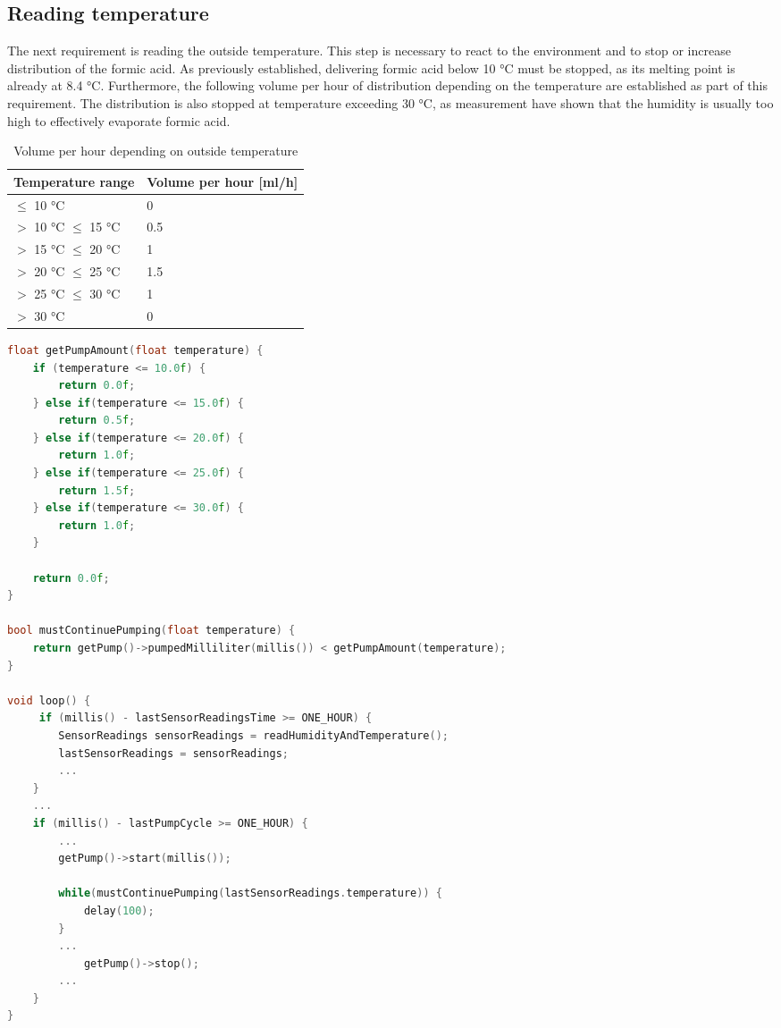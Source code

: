 \subsection{Reading temperature}\label{subsec:reading-temperature}

The next requirement is reading the outside temperature.
This step is necessary to react to the environment and to stop or increase distribution of the formic acid.
As previously established, delivering formic acid below 10 °C must be stopped, as its melting point is already at 8.4 °C.
Furthermore, the following volume per hour of distribution depending on the temperature are established as part of this requirement.
The distribution is also stopped at temperature exceeding 30 °C, as measurement have shown that the humidity is usually too high to effectively evaporate formic acid.

\begin{table}[h]
    \centering
    \caption{Volume per hour depending on outside temperature}
    \label{tab:volume-per-hour-depending-on-temperature}
    \renewcommand{\arraystretch}{1.2}
    \begin{tabular}{l|l}
        Temperature range & Volume per hour [ml/h] \\
        \hline
        $\leq$ 10 °C & 0 \\
        $ > $ 10 °C $\leq$ 15 °C & 0.5 \\
        $ > $ 15 °C $\leq$ 20 °C & 1 \\
        $ > $ 20 °C $\leq$ 25 °C & 1.5 \\
        $ > $ 25 °C $\leq$ 30 °C & 1 \\
        $ > $ 30 °C & 0
    \end{tabular}
\end{table}

\newpage
\begin{lstlisting}[label={lst:react-to-temperature},language=C++, caption=Determining volume based on temperature]
float getPumpAmount(float temperature) {
    if (temperature <= 10.0f) {
        return 0.0f;
    } else if(temperature <= 15.0f) {
        return 0.5f;
    } else if(temperature <= 20.0f) {
        return 1.0f;
    } else if(temperature <= 25.0f) {
        return 1.5f;
    } else if(temperature <= 30.0f) {
        return 1.0f;
    }

    return 0.0f;
}

bool mustContinuePumping(float temperature) {
    return getPump()->pumpedMilliliter(millis()) < getPumpAmount(temperature);
}

void loop() {
     if (millis() - lastSensorReadingsTime >= ONE_HOUR) {
        SensorReadings sensorReadings = readHumidityAndTemperature();
        lastSensorReadings = sensorReadings;
        ...
    }
    ...
    if (millis() - lastPumpCycle >= ONE_HOUR) {
        ...
        getPump()->start(millis());

        while(mustContinuePumping(lastSensorReadings.temperature)) {
            delay(100);
        }
        ...
            getPump()->stop();
        ...
    }
}
\end{lstlisting}

